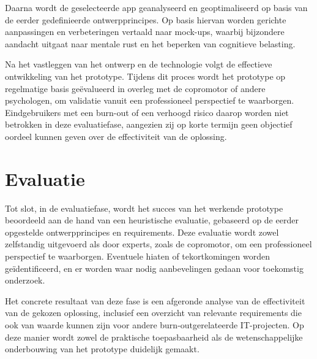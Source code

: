 \vspace{1em}

Daarna wordt de geselecteerde app geanalyseerd en geoptimaliseerd op basis van de eerder gedefinieerde ontwerpprincipes. Op basis hiervan worden gerichte aanpassingen en verbeteringen vertaald naar mock-ups, waarbij bijzondere aandacht uitgaat naar mentale rust en het beperken van cognitieve belasting.

\vspace{1em}

Na het vastleggen van het ontwerp en de technologie volgt de effectieve ontwikkeling van het prototype. Tijdens dit proces wordt het prototype op regelmatige basis geëvalueerd in overleg met de copromotor of andere psychologen, om validatie vanuit een professioneel perspectief te waarborgen. Eindgebruikers met een burn-out of een verhoogd risico daarop worden niet betrokken in deze evaluatiefase, aangezien zij op korte termijn geen objectief oordeel kunnen geven over de effectiviteit van de oplossing.

\vspace{1em}




\section{Evaluatie}
\label{sec:evaluatie}

\vspace{1em}

Tot slot, in de evaluatiefase, wordt het succes van het werkende prototype beoordeeld aan de hand van een heuristische evaluatie, gebaseerd op de eerder opgestelde ontwerpprincipes en requirements. Deze evaluatie wordt zowel zelfstandig uitgevoerd als door experts, zoals de copromotor, om een professioneel perspectief te waarborgen. Eventuele hiaten of tekortkomingen worden geïdentificeerd, en er worden waar nodig aanbevelingen gedaan voor toekomstig onderzoek. 

\vspace{1em}

Het concrete resultaat van deze fase is een afgeronde analyse van de effectiviteit van de gekozen oplossing, inclusief een overzicht van relevante requirements die ook van waarde kunnen zijn voor andere burn-outgerelateerde IT-projecten. Op deze manier wordt zowel de praktische toepasbaarheid als de wetenschappelijke onderbouwing van het prototype duidelijk gemaakt.

